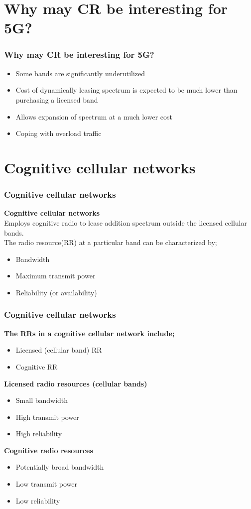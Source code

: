 \documentclass{beamer}
\begin{document}
\section{Why may CR be interesting for 5G?}
\begin{frame}
\frametitle{Why may CR be interesting for 5G?}
\begin{itemize}
\item Some bands are significantly underutilized
\item Cost of dynamically leasing spectrum is expected to be much lower than purchasing a licensed band
\item Allows expansion of spectrum at a much lower cost
\item Coping with overload traffic
\end{itemize}
\end{frame}


\section{Cognitive cellular networks}
\begin{frame}
\frametitle{Cognitive cellular networks}
\textbf{Cognitive cellular networks}\\
Employs cognitive radio to lease addition spectrum outside the licensed cellular bands.\\

The radio resource(RR) at a particular band can be characterized
by;
\begin{itemize}
\item Bandwidth
\item Maximum transmit power
\item Reliability (or availability)
\end{itemize}
\end{frame}

\begin{frame}
\frametitle{Cognitive cellular networks}
\textbf{The RRs in a cognitive cellular network include;} 
\begin{itemize}
\item Licensed (cellular band) RR 
\item Cognitive RR
\end{itemize}

\textbf{Licensed radio resources (cellular bands)}
\begin{itemize}
\item Small bandwidth
\item High transmit power
\item High reliability
\end{itemize}
\textbf{Cognitive radio resources}
\begin{itemize}
\item Potentially broad bandwidth
\item Low transmit power
\item Low reliability
\end{itemize}
\end{frame}
\end{document}
